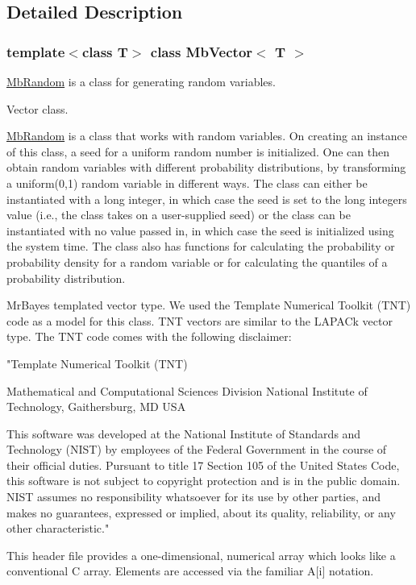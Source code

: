\subsection{Detailed Description}
\subsubsection*{template$<$class T$>$\newline
class Mb\+Vector$<$ T $>$}

\mbox{\hyperlink{class_mb_random}{Mb\+Random}} is a class for generating random variables. 

Vector class.

\mbox{\hyperlink{class_mb_random}{Mb\+Random}} is a class that works with random variables. On creating an instance of this class, a seed for a uniform random number is initialized. One can then obtain random variables with different probability distributions, by transforming a uniform(0,1) random variable in different ways. The class can either be instantiated with a long integer, in which case the seed is set to the long integers value (i.\+e., the class takes on a user-\/supplied seed) or the class can be instantiated with no value passed in, in which case the seed is initialized using the system time. The class also has functions for calculating the probability or probability density for a random variable or for calculating the quantiles of a probability distribution.

Mr\+Bayes templated vector type. We used the Template Numerical Toolkit (T\+NT) code as a model for this class. T\+NT vectors are similar to the L\+A\+P\+A\+Ck vector type. The T\+NT code comes with the following disclaimer\+:

"Template Numerical Toolkit (T\+NT)

Mathematical and Computational Sciences Division National Institute of Technology, Gaithersburg, MD U\+SA

This software was developed at the National Institute of Standards and Technology (N\+I\+ST) by employees of the Federal Government in the course of their official duties. Pursuant to title 17 Section 105 of the United States Code, this software is not subject to copyright protection and is in the public domain. N\+I\+ST assumes no responsibility whatsoever for its use by other parties, and makes no guarantees, expressed or implied, about its quality, reliability, or any other characteristic."

This header file provides a one-\/dimensional, numerical array which looks like a conventional C array. Elements are accessed via the familiar A\mbox{[}i\mbox{]} notation.

